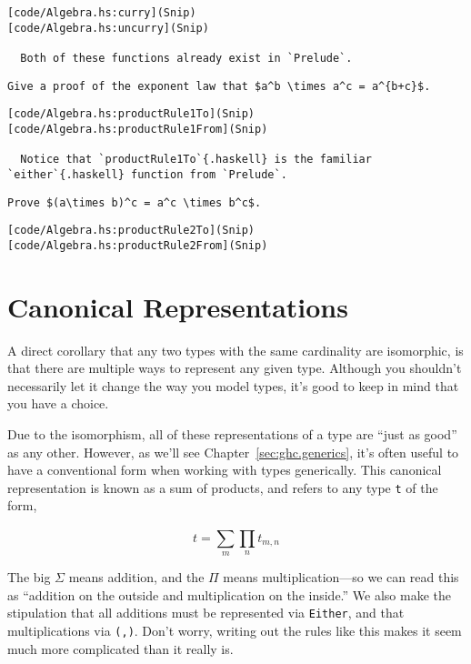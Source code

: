 \documentclass[
  11pt,
]{book}
\theoremstyle{nonumberplain}
\begin{document}
\begin{verbatim}
[code/Algebra.hs:curry](Snip)
[code/Algebra.hs:uncurry](Snip)

  Both of these functions already exist in `Prelude`.
\end{verbatim}

\begin{verbatim}
Give a proof of the exponent law that $a^b \times a^c = a^{b+c}$.
\end{verbatim}

\begin{verbatim}
[code/Algebra.hs:productRule1To](Snip)
[code/Algebra.hs:productRule1From](Snip)

  Notice that `productRule1To`{.haskell} is the familiar `either`{.haskell} function from `Prelude`.
\end{verbatim}

\begin{verbatim}
Prove $(a\times b)^c = a^c \times b^c$.
\end{verbatim}

\begin{verbatim}
[code/Algebra.hs:productRule2To](Snip)
[code/Algebra.hs:productRule2From](Snip)
\end{verbatim}

\hypertarget{canonical-representations}{%
\section{Canonical Representations}\label{canonical-representations}}

A direct corollary that any two types with the same cardinality are
isomorphic, is that there are multiple ways to represent any given type.
Although you shouldn't necessarily let it change the way you model
types, it's good to keep in mind that you have a choice.

Due to the isomorphism, all of these representations of a type are
``just as good'' as any other. However, as we'll see
Chapter~\ref{sec:ghc.generics}, it's often useful to have a conventional
form when working with types generically. This canonical representation
is known as a sum of products, and refers to any type \texttt{t} of the
form,

\[
{t = \sum_{m}^{}{\prod_{n}^{}{t_{m,n}}}}
\]

The big \(\Sigma\) means addition, and the \(\Pi\) means
multiplication---so we can read this as ``addition on the outside and
multiplication on the inside.'' We also make the stipulation that all
additions must be represented via \texttt{Either}, and that
multiplications via \texttt{(,)}. Don't worry, writing out the rules
like this makes it seem much more complicated than it really is.
\end{document}
